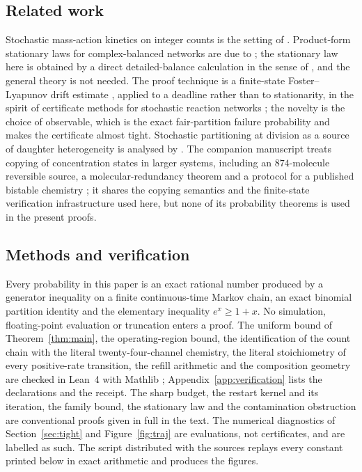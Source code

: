 \documentclass[11pt,a4paper]{article}
\theoremstyle{plain}
\theoremstyle{definition}
\theoremstyle{remark}
\begin{document}
\subsection{Related work}
Stochastic mass-action kinetics on integer counts is the setting of \citet{kurtz1972,gillespie1977,andersonkurtz2015}. Product-form stationary laws for complex-balanced networks are due to \citet{anderson2010}; the stationary law here is obtained by a direct detailed-balance calculation in the sense of \citet{kelly1979,schnakenberg1976}, and the general theory is not needed. The proof technique is a finite-state Foster--Lyapunov drift estimate \citep{meyntweedie1993}, applied to a deadline rather than to stationarity, in the spirit of certificate methods for stochastic reaction networks \citep{gupta2014,kuntz2019}; the novelty is the choice of observable, which is the exact fair-partition failure probability and makes the certificate almost tight. Stochastic partitioning at division as a source of daughter heterogeneity is analysed by \citet{huh2011}. The companion manuscript \citep{companion2026} treats copying of concentration states in larger systems, including an $874$-molecule reversible source, a molecular-redundancy theorem and a protocol for a published bistable chemistry \citep{semenov2016}; it shares the copying semantics and the finite-state verification infrastructure used here, but none of its probability theorems is used in the present proofs.

\subsection{Methods and verification}
Every probability in this paper is an exact rational number produced by a generator inequality on a finite continuous-time Markov chain, an exact binomial partition identity and the elementary inequality $e^x\ge1+x$. No simulation, floating-point evaluation or truncation enters a proof. The uniform bound of Theorem~\ref{thm:main}, the operating-region bound, the identification of the count chain with the literal twenty-four-channel chemistry, the literal stoichiometry of every positive-rate transition, the refill arithmetic and the composition geometry are checked in Lean~4 with Mathlib \citep{demoura2021,mathlib2020}; Appendix~\ref{app:verification} lists the declarations and the receipt. The sharp budget, the restart kernel and its iteration, the family bound, the stationary law and the contamination obstruction are conventional proofs given in full in the text. The numerical diagnostics of Section~\ref{sec:tight} and Figure~\ref{fig:traj} are evaluations, not certificates, and are labelled as such. The script  distributed with the sources replays every constant printed below in exact arithmetic and produces the figures.
\end{document}
